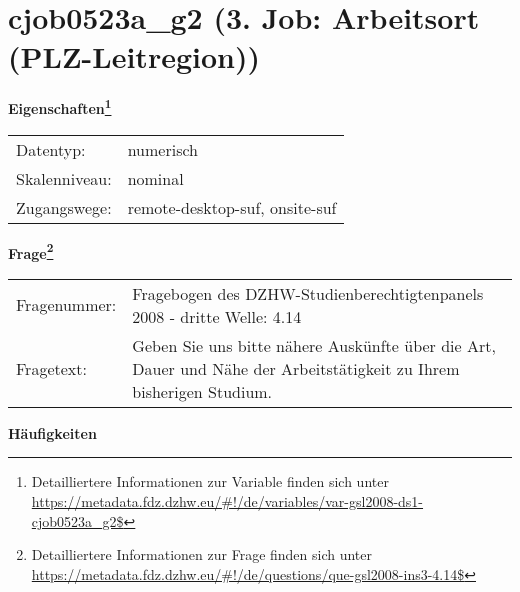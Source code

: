 
    \setcounter{footnote}{0}

    \vspace*{-1.8cm}
	\section{cjob0523a\_g2 (3. Job: Arbeitsort (PLZ-Leitregion))}
	\label{section:cjob0523a_g2}



    \vspace*{0.5cm}
    \noindent\textbf{Eigenschaften\footnote{Detailliertere Informationen zur Variable finden sich unter
		\url{https://metadata.fdz.dzhw.eu/\#!/de/variables/var-gsl2008-ds1-cjob0523a_g2$}}}\\
	\begin{tabularx}{\hsize}{@{}lX}
	Datentyp: & numerisch \\
	Skalenniveau: & nominal \\
	Zugangswege: &
	  remote-desktop-suf, 
	  onsite-suf
 \\
    \end{tabularx}



				\vspace*{0.5cm}
                \noindent\textbf{Frage\footnote{Detailliertere Informationen zur Frage finden sich unter
		              \url{https://metadata.fdz.dzhw.eu/\#!/de/questions/que-gsl2008-ins3-4.14$}}}\\
				\begin{tabularx}{\hsize}{@{}lX}
					Fragenummer: &
					  Fragebogen des DZHW-Studienberechtigtenpanels 2008 - dritte Welle:
					  4.14
 \\
					Fragetext: & Geben Sie uns bitte nähere Auskünfte über die Art, Dauer und Nähe der Arbeitstätigkeit zu Ihrem bisherigen Studium. \\
				\end{tabularx}





        		\vspace*{0.5cm}
                \noindent\textbf{Häufigkeiten}

